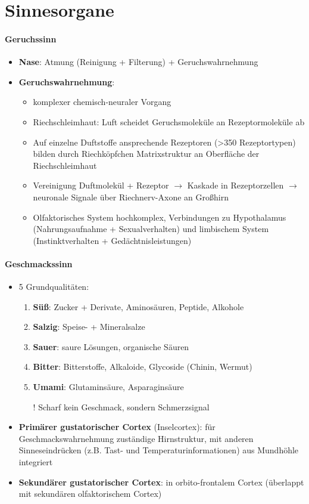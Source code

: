 \section*{Sinnesorgane}

\paragraph{Geruchssinn}
\begin{itemize}
  \item \textbf{Nase}: Atmung (Reinigung + Filterung) + Geruchswahrnehmung
  \item \textbf{Geruchswahrnehmung}:
  \begin{itemize}
    \item komplexer chemisch-neuraler Vorgang
    \item Riechschleimhaut: Luft scheidet Geruchsmoleküle an Rezeptormoleküle ab
    \item Auf einzelne Duftstoffe ansprechende Rezeptoren (>350 Rezeptortypen) bilden durch Riechköpfchen Matrixstruktur an Oberfläche der Riechschleimhaut
    \item Vereinigung Duftmolekül + Rezeptor \( \to \) Kaskade in Rezeptorzellen \( \to \) neuronale Signale über Riechnerv-Axone an Großhirn
    \item Olfaktorisches System hochkomplex, Verbindungen zu Hypothalamus (Nahrungsaufnahme + Sexualverhalten) und limbischem System (Instinktverhalten + Gedächtnisleistungen)
  \end{itemize}
\end{itemize}

\paragraph{Geschmackssinn}
\begin{itemize}
  \item 5 Grundqualitäten:
  \begin{enumerate}
    \item \textbf{Süß}: Zucker + Derivate, Aminosäuren, Peptide, Alkohole
    \item \textbf{Salzig}: Speise- + Mineralsalze
    \item \textbf{Sauer}: saure Lösungen, organische Säuren
    \item \textbf{Bitter}: Bitterstoffe, Alkaloide, Glycoside (Chinin, Wermut)
    \item \textbf{Umami}: Glutaminsäure, Asparaginsäure
    \item[!] Scharf kein Geschmack, sondern Schmerzsignal
  \end{enumerate}
  \item \textbf{Primärer gustatorischer Cortex} (Inselcortex): für Geschmacks\-wahr\-nehm\-ung zuständige Hirnstruktur, mit anderen Sinneseindrücken (z.B. Tast- und Temperaturinformationen) aus Mundhöhle integriert
  \item \textbf{Sekundärer gustatorischer Cortex}: in orbito-frontalem Cortex (überlappt mit sekundären olfaktorischem Cortex)
\end{itemize}

